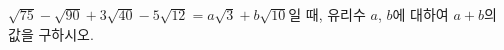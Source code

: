 $\sqrt{75}-\sqrt{90}+3\sqrt{40}-5\sqrt{12}=a\sqrt{3}+b\sqrt{10}$일 때, 유리수 $a$, $b$에 대하여 $a+b$의 값을 구하시오.
